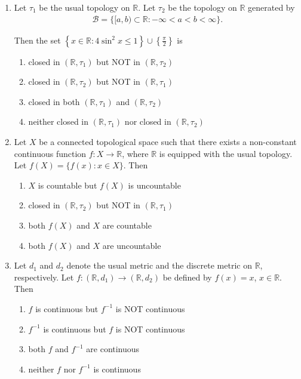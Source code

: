 \documentclass[journal]{IEEEtran}
\numberwithin{equation}{enumi}
\numberwithin{figure}{enumi}
\begin{document}
\begin{enumerate}
\item Let $\tau_1$ be the usual topology on $\mathbb{R}$. Let $\tau_2$ be the topology on $\mathbb{R}$ generated by 
\begin{align*}
\mathcal{B} = \{ [a,b) \subset \mathbb{R} : -\infty < a < b < \infty \}.
\end{align*} 

Then the set $\left\{ x \in \mathbb{R} : 4 \sin^2 x \leq 1 \right\} \cup \left\{ \frac{\pi}{2} \right\}$ is
\hfill{}
\begin{enumerate}
 \item  closed in $(\mathbb{R}, \tau_1)$ but NOT in $(\mathbb{R}, \tau_2)$
 \item  closed in $(\mathbb{R}, \tau_2)$ but NOT in $(\mathbb{R}, \tau_1)$
 \item  closed in both $(\mathbb{R}, \tau_1)$ and $(\mathbb{R}, \tau_2)$
 \item  neither closed in $(\mathbb{R}, \tau_1)$ nor closed in $(\mathbb{R}, \tau_2)$
\end{enumerate}

\item Let $X$ be a connected topological space such that there exists a non-constant continuous function $f : X \to \mathbb{R}$, where $\mathbb{R}$ is equipped with the usual topology. Let $f(X) = \{ f(x) : x \in X \}$. Then
\hfill{}
\begin{enumerate}
 \item  $X$ is countable but $f(X)$ is uncountable
 \item  closed in $(\mathbb{R}, \tau_2)$ but NOT in $(\mathbb{R}, \tau_1)$
 \item  both $f(X)$ and $X$ are countable
 \item both $f(X)$ and $X$ are uncountable
\end{enumerate}


\item Let $d_1$ and $d_2$ denote the usual metric and the discrete metric on $\mathbb{R}$, respectively. Let $f : (\mathbb{R}, d_1) \to (\mathbb{R}, d_2)$ be defined by $f(x) = x$, $x \in \mathbb{R}$. Then \hfill{}
\begin{enumerate}
\item  $f$ is continuous but $f^{-1}$ is NOT continuous
\item  $f^{-1}$ is continuous but $f$ is NOT continuous
\item  both $f$ and $f^{-1}$ are continuous
\item  neither $f$ nor $f^{-1}$ is continuous
\end{enumerate}



\end{enumerate}
\end{document}
